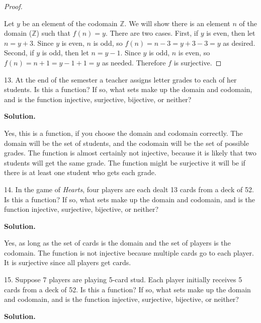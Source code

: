 \documentclass[10pt,]{book}
\theoremstyle{plain}
\theoremstyle{definition}
\theoremstyle{definition}
\theoremstyle{definition}
\def\Z{\mathbb Z}
\begin{document}
\begin{exerciselist}
\begin{enumerate}[label=(\alph*)]
              \begin{proof}\hypertarget{proof-2}{}

                  Let \(y\) be an element of the codomain \(\Z\). We will show there is an element \(n\) of the domain (\(\Z\)) such that \(f(n) = y\). There are two cases. First, if \(y\) is even, then let \(n = y+3\). Since \(y\) is even, \(n\) is odd, so \(f(n) = n-3 = y+3-3 = y\) as desired. Second, if \(y\) is odd, then let \(n = y-1\). Since \(y\) is odd, \(n\) is even, so \(f(n) = n+1 = y-1+1 = y\) as needed. Therefore \(f\) is surjective.
\end{proof}
\end{enumerate}
\item[13.]\hypertarget{exercise-39}{}
            At the end of the semester a teacher assigns letter grades to each of her students. Is this a function? If so, what sets make up the domain and codomain, and is the function injective, surjective, bijective, or neither?
\par\smallskip
\par\smallskip
\noindent\textbf{Solution.}\hypertarget{solution-57}{}\quad

            Yes, this is a function, if you choose the domain and codomain correctly. The domain will be the set of students, and the codomain will be the set of possible grades. The function is almost certainly not injective, because it is likely that two students will get the same grade. The function might be surjective \textendash{} it will be if there is at least one student who gets each grade.
\item[14.]\hypertarget{exercise-40}{}
            In the game of \emph{Hearts}, four players are each dealt 13 cards from a deck of 52. Is this a function? If so, what sets make up the domain and codomain, and is the function injective, surjective, bijective, or neither?
\par\smallskip
\par\smallskip
\noindent\textbf{Solution.}\hypertarget{solution-58}{}\quad

            Yes, as long as the set of cards is the domain and the set of players is the codomain. The function is not injective because multiple cards go to each player. It is surjective since all players get cards.
\item[15.]\hypertarget{exercise-41}{}
            Suppose 7 players are playing 5-card stud. Each player initially receives 5 cards from a deck of 52. Is this a function? If so, what sets make up the domain and codomain, and is the function injective, surjective, bijective, or neither?
\par\smallskip
\par\smallskip
\noindent\textbf{Solution.}\hypertarget{solution-59}{}\quad


\end{exerciselist}
\end{document}
